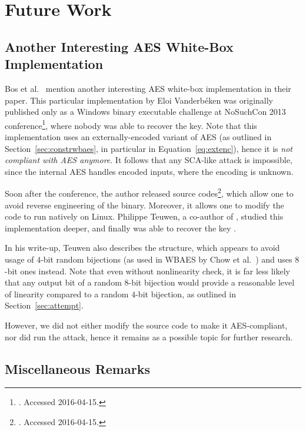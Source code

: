 \chapter{Future Work}
\label{chap:future}

\section{Another Interesting AES White-Box Implementation}
\label{sec:magicimpl}

Bos et al.\ \cite{bos2015differential} mention another interesting AES white-box implementation in their paper. This particular implementation by Eloi Vanderbéken was originally published only as a Windows binary executable challenge at NoSuchCon 2013 conference\footnote{. Accessed 2016-04-15.}, where nobody was able to recover the key. Note that this implementation uses an externally-encoded variant of AES (as outlined in Section~\ref{sec:constrwbaes}, in particular in Equation~\ref{eq:extenc}), hence it is {\em not compliant with AES anymore}. It follows that any SCA-like attack is impossible, since the internal AES handles encoded inputs, where the encoding is unknown.

Soon after the conference, the author released source codes\footnote{. Accessed 2016-04-15.}, which allow one to avoid reverse engineering of the binary. Moreover, it allows one to modify the code to run natively on Linux. Philippe Teuwen, a co-author of \cite{bos2015differential}, studied this implementation deeper, and finally was able to recover the key \cite{teuwen2015nscwriteups}.

In his write-up, Teuwen also describes the structure, which appears to avoid usage of $4$-bit random bijections (as used in WBAES by Chow et al.\ \cite{chow2002aes}) and uses $8$-bit ones instead. Note that even without nonlinearity check, it is far less likely that any output bit of a random $8$-bit bijection would provide a reasonable level of linearity compared to a random $4$-bit bijection, as outlined in Section~\ref{sec:attempt}.

However, we did not either modify the source code to make it AES-compliant, nor did run the attack, hence it remains as a possible topic for further research.


\section{Miscellaneous Remarks}

